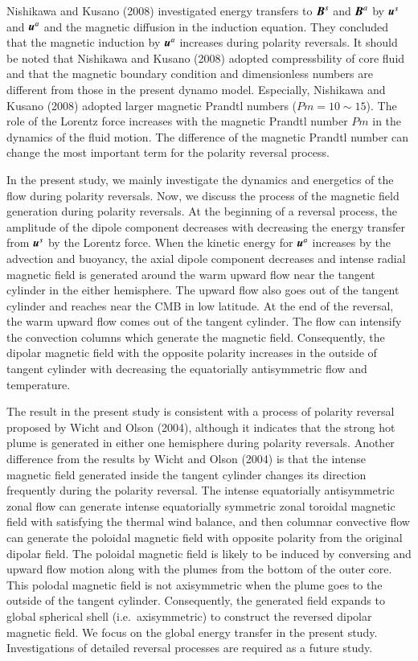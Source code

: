 

Nishikawa and Kusano (2008) %
investigated energy transfers to $\mbox{\boldmath$B$}^s$ and 
 $\mbox{\boldmath$B$}^a$ by $\mbox{\boldmath$u$}^s$ and 
 $\mbox{\boldmath$u$}^a$ and the magnetic diffusion in the induction equation.
They concluded that the magnetic induction by $\mbox{\boldmath$u$}^a$ increases during polarity reversals. 
It should be noted that Nishikawa and Kusano (2008) adopted compressbility of core fluid and that the magnetic boundary condition and dimensionless numbers are different from those in the present dynamo model.
Especially, Nishikawa and Kusano (2008) adopted larger magnetic Prandtl numbers ($Pm = 10 \sim 15$). 
The role of the Lorentz force increases with the magnetic Prandtl number $Pm$ in the dynamics of the fluid motion.
The difference of the magnetic Prandtl number can change the most important term for the polarity reversal process. 

In the present study, we mainly investigate the dynamics and energetics of the flow during polarity reversals. 
Now, we discuss the process of the magnetic field generation during polarity reversals. 
At the beginning of a reversal process, the amplitude of the dipole component decreases with decreasing the energy transfer from $\mbox{\boldmath$u$}^s$ by the Lorentz force. 
When the kinetic energy for $\mbox{\boldmath$u$}^a$ increases by the advection and buoyancy, the axial dipole component decreases and intense radial magnetic field is generated around the warm upward flow near the tangent cylinder in the either hemisphere. 
The upward flow also goes out of the tangent cylinder and reaches near the CMB in low latitude. 
At the end of the reversal, the warm upward flow comes out of the tangent cylinder. 
The flow can intensify the convection columns which generate the magnetic field. 
Consequently, the dipolar magnetic field with the opposite polarity increases in the outside of tangent cylinder with decreasing the equatorially antisymmetric flow and temperature. 

The result in the present study is consistent with a process of polarity reversal proposed by Wicht and Olson (2004), %
although it indicates that the strong hot plume is generated in either one hemisphere during polarity reversals. Another difference from the results by Wicht and Olson (2004) is that the intense magnetic field generated inside the tangent cylinder changes its direction frequently during the polarity reversal.
The intense equatorially antisymmetric zonal flow can generate intense equatorially symmetric zonal toroidal magnetic field with satisfying the thermal wind balance, and then columnar convective flow can generate the poloidal magnetic field with opposite polarity from the original dipolar field.
The poloidal magnetic field is likely to be induced by conversing and upward flow motion along with the plumes from the bottom of the outer core.
This polodal magnetic field is not axisymmetric when the plume goes to the outside of the tangent cylinder. 
Consequently, the generated field expands to global spherical shell (i.e.\ axisymmetric) to construct the reversed dipolar magnetic field.
We focus on the global energy transfer in the present study. 
Investigations of detailed reversal processes are required as a future study.

